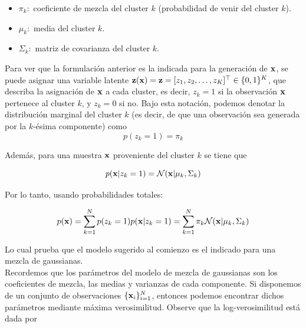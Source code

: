 \begin{itemize}
	\item $\pi_k:$ coeficiente de mezcla del cluster  $k$ (probabilidad de venir del cluster $k$).
	\item $\mu_k:$ media del cluster  $k$.
	\item $\Sigma_k:$ matriz de covarianza del cluster  $k$.
\end{itemize}

Para ver que la formulación anterior es la indicada para la generación de $\mathbf{x}$, se puede asignar una variable latente $\mathbf{z}(\mathbf{x}) = \mathbf{z} = [z_1,z_2,\ldots,z_K]^\top\in\{0,1\}^K$, que describa la asignación de $\mathbf{x}$ a cada cluster, es decir, $z_{k}=1$ si la observación $\mathbf{x}$ pertenece al cluster $k$, y $z_{k}=0$ si no. Bajo esta notación, podemos denotar la distribución marginal del cluster $k$ (es decir, de que una observación sea generada por la $k$-ésima componente) como 
\begin{equation}
 	p(z_k=1) = \pi_k \label{eq:GMM_marg1}
\end{equation} 

Además, para una muestra $\mathbf{x}$ proveniente del cluster $k$ se tiene que

\begin{equation}
	p(\mathbf{x}|z_k=1) = {\mathcal N}(\mathbf{x}|\mu_k,\Sigma_k)
\end{equation}

Por lo tanto, usando probabilidades totales:

\begin{equation}
	p(\mathbf{x})=\sum_{k=1}^N p(z_k=1) p(\mathbf{x}|z_k=1) = \sum_{k=1}^N \pi_k {\mathcal N}(\mathbf{x}|\mu_k,\Sigma_k)
\end{equation}

Lo cual prueba que el modelo sugerido al comienzo es el indicado para una mezcla de gaussianas.\\

Recordemos que los parámetros del modelo de mezcla de gaussianas son los coeficientes de mezcla, las medias y varianzas de cada componente. Si disponemos de un conjunto de observaciones $\{\mathbf{x}_i\}_{i=1}^N$, entonces podemos encontrar dichos parámetros mediante máxima verosimilitud. Observe que la log-verosimilitud está dada por 

